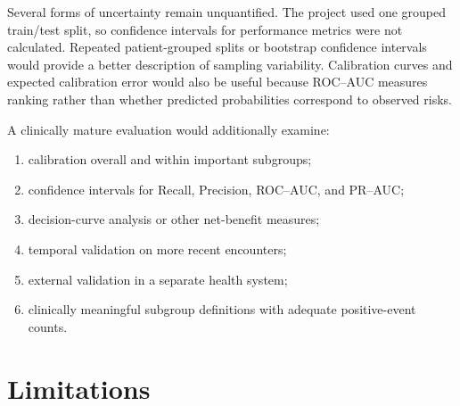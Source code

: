 \documentclass[10pt,a4paper]{article}
\begin{document}
Several forms of uncertainty remain unquantified. The project used one grouped train/test split, so confidence intervals for performance metrics were not calculated. Repeated patient-grouped splits or bootstrap confidence intervals would provide a better description of sampling variability. Calibration curves and expected calibration error would also be useful because ROC--AUC measures ranking rather than whether predicted probabilities correspond to observed risks.

A clinically mature evaluation would additionally examine:
\begin{enumerate}[leftmargin=1.2cm]
\item calibration overall and within important subgroups;
\item confidence intervals for Recall, Precision, ROC--AUC, and PR--AUC;
\item decision-curve analysis or other net-benefit measures;
\item temporal validation on more recent encounters;
\item external validation in a separate health system;
\item clinically meaningful subgroup definitions with adequate positive-event counts.
\end{enumerate}

\section{Limitations}
\end{document}
